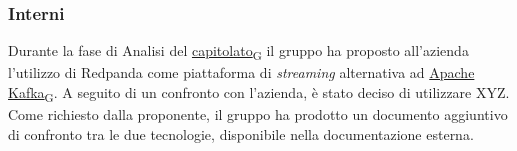 \subsubsection{Interni}
Durante la fase di Analisi del \href{https://7last.github.io/docs/rtb/documentazione-interna/glossario#capitolato}{capitolato\textsubscript{G}} il gruppo ha proposto all'azienda
l'utilizzo di Redpanda come piattaforma di \textit{streaming} alternativa ad \href{https://7last.github.io/docs/rtb/documentazione-interna/glossario#apache-kafka}{Apache Kafka\textsubscript{G}}.
A seguito di un confronto con l'azienda, è stato deciso di utilizzare XYZ.\\ %
Come richiesto dalla proponente, il gruppo ha prodotto un documento aggiuntivo di
confronto tra le due tecnologie, disponibile nella documentazione esterna. %





